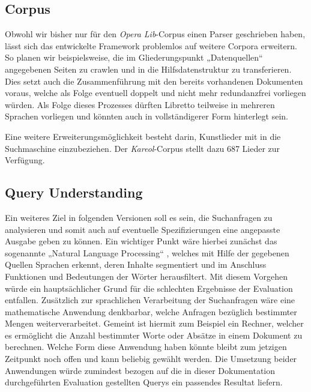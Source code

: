 \subsection{Corpus}
Obwohl wir bisher nur für den \emph{Opera Lib}-Corpus
einen Parser geschrieben haben,
lässt sich das entwickelte Framework problemlos auf weitere Corpora erweitern.
So planen wir beispielsweise,
die im Gliederungspunkt „Datenquellen“ angegebenen Seiten zu crawlen
und in die Hilfsdatenstruktur zu transferieren.
Dies setzt auch die Zusammenführung
mit den bereits vorhandenen Dokumenten voraus,
welche als Folge eventuell doppelt
und nicht mehr redundanzfrei vorliegen würden.
Als Folge dieses Prozesses dürften Libretto teilweise
in mehreren Sprachen vorliegen
und könnten auch in vollständigerer Form hinterlegt sein.

Eine weitere Erweiterungsmöglichkeit besteht darin,
Kunstlieder mit in die Suchmaschine einzubeziehen.
Der \emph{Kareol}-Corpus stellt dazu 687 Lieder zur Verfügung.

\subsection{Query Understanding}
Ein weiteres Ziel in folgenden Versionen soll es sein,
die Suchanfragen zu analysieren
und somit auch auf eventuelle Spezifizierungen
eine angepasste Ausgabe geben zu können.
Ein wichtiger Punkt wäre hierbei zunächst
das sogenannte „Natural Language Processing“ \cite{liddy2001natural},
welches mit Hilfe der gegebenen Quellen Sprachen erkennt,
deren Inhalte segmentiert und im Anschluss Funktionen
und Bedeutungen der Wörter herausfiltert.
Mit diesem Vorgehen würde ein hauptsächlicher Grund
für die schlechten Ergebnisse der Evaluation entfallen.
Zusätzlich zur sprachlichen Verarbeitung der Suchanfragen
wäre eine mathematische Anwendung denkbarbar,
welche Anfragen bezüglich bestimmter Mengen weiterverarbeitet.
Gemeint ist hiermit zum Beispiel ein Rechner,
welcher es ermöglicht die Anzahl bestimmter Worte oder Absätze
in einem Dokument zu berechnen. Welche Form diese Anwendung haben
könnte bleibt zum jetzigen Zeitpunkt noch offen und kann beliebig gewählt werden.
Die Umsetzung beider Anwendungen würde zumindest bezogen auf die in dieser
Dokumentation durchgeführten Evaluation gestellten Querys ein passendes Resultat liefern.

